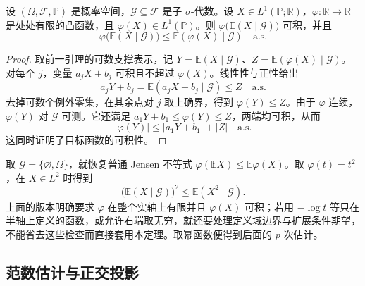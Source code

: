 \begin{theorem}[条件 Jensen]\label{b1:thm:conditional-jensen-31}
设 \((\Omega,\mathcal F,\mathbb P)\) 是概率空间，\(\mathcal G\subseteq\mathcal F\) 是子 \(\sigma\)-代数。设 \(X\in L^1(\mathbb P;\mathbb R)\)，\(\varphi:\mathbb R\rightarrow\mathbb R\) 是处处有限的凸函数，且 \(\varphi(X)\in L^1(\mathbb P)\)。则 \(\varphi\bigl(\mathbb E(X\mid\mathcal G)\bigr)\) 可积，并且
\begin{equation}\label{b1:eq:conditional-jensen-31}
 \varphi\bigl(\mathbb E(X\mid\mathcal G)\bigr)
 \leq\mathbb E(\varphi(X)\mid\mathcal G)
 \quad\text{a.s.}
\end{equation}
\end{theorem}
\begin{proof}
取前一引理的可数支撑表示，记 \(Y=\mathbb E(X\mid\mathcal G)\)、\(Z=\mathbb E(\varphi(X)\mid\mathcal G)\)。对每个 \(j\)，变量 \(a_jX+b_j\) 可积且不超过 \(\varphi(X)\)。线性性与正性给出
\[
 a_jY+b_j
 =\mathbb E(a_jX+b_j\mid\mathcal G)\leq Z
 \quad\text{a.s.}
\]
去掉可数个例外零集，在其余点对 \(j\) 取上确界，得到 \(\varphi(Y)\leq Z\)。由于 \(\varphi\) 连续，\(\varphi(Y)\) 对 \(\mathcal G\) 可测。它还满足 \(a_1Y+b_1\leq\varphi(Y)\leq Z\)，两端均可积，从而
\[
 |\varphi(Y)|\leq|a_1Y+b_1|+|Z|
 \quad\text{a.s.}
\]
这同时证明了目标函数的可积性。
\end{proof}

取 \(\mathcal G=\{\varnothing,\Omega\}\)，就恢复普通 Jensen 不等式
\(\varphi(\mathbb E X)\leq\mathbb E\varphi(X)\)。取 \(\varphi(t)=t^2\)，在 \(X\in L^2\) 时得到
\[
 \bigl(\mathbb E(X\mid\mathcal G)\bigr)^2
 \leq\mathbb E(X^2\mid\mathcal G).
\]
上面的版本明确要求 \(\varphi\) 在整个实轴上有限并且 \(\varphi(X)\) 可积；若用 \(-\log t\) 等只在半轴上定义的函数，或允许右端取无穷，就还要处理定义域边界与扩展条件期望，不能省去这些检查而直接套用本定理。取幂函数便得到后面的 \(p\) 次估计。

\subsection{范数估计与正交投影}
\label{b1:subsec:310204}

